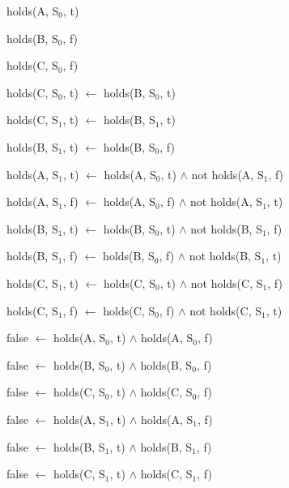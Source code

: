 \documentclass[a4paper,draft]{article}
\begin{document}
        \begin{list}{}{Initial State}
          \item holds(A, S$_{0}$, t)
          \item holds(B, S$_{0}$, f)
          \item holds(C, S$_{0}$, f)
        \end{list}

        \begin{list}{}{Constraint}
          \item holds(C, S$_{0}$, t) $\leftarrow$ holds(B, S$_{0}$, t)
          \item holds(C, S$_{1}$, t) $\leftarrow$ holds(B, S$_{1}$, t)
        \end{list}

        \begin{list}{}{Transformation}
          \item holds(B, S$_{1}$, t) $\leftarrow$ holds(B, S$_{0}$, f)
        \end{list}

        \begin{list}{}{Inertial Rules}
          \item
            holds(A, S$_{1}$, t) $\leftarrow$ holds(A, S$_{0}$, t) $\land$ not
            holds(A, S$_{1}$, f)
          \item
            holds(A, S$_{1}$, f) $\leftarrow$ holds(A, S$_{0}$, f) $\land$ not
            holds(A, S$_{1}$, t)
          \item
            holds(B, S$_{1}$, t) $\leftarrow$ holds(B, S$_{0}$, t) $\land$ not
            holds(B, S$_{1}$, f)
          \item
            holds(B, S$_{1}$, f) $\leftarrow$ holds(B, S$_{0}$, f) $\land$ not
            holds(B, S$_{1}$, t)
          \item
            holds(C, S$_{1}$, t) $\leftarrow$ holds(C, S$_{0}$, t) $\land$ not
            holds(C, S$_{1}$, f)
          \item
            holds(C, S$_{1}$, f) $\leftarrow$ holds(C, S$_{0}$, f) $\land$ not
            holds(C, S$_{1}$, t)
        \end{list}

        \begin{list}{}{Complementary Rules}
          \item
            false $\leftarrow$ holds(A, S$_{0}$, t) $\land$ holds(A, S$_{0}$, f)
          \item
            false $\leftarrow$ holds(B, S$_{0}$, t) $\land$ holds(B, S$_{0}$, f)
          \item
            false $\leftarrow$ holds(C, S$_{0}$, t) $\land$ holds(C, S$_{0}$, f)
          \item
            false $\leftarrow$ holds(A, S$_{1}$, t) $\land$ holds(A, S$_{1}$, f)
          \item
            false $\leftarrow$ holds(B, S$_{1}$, t) $\land$ holds(B, S$_{1}$, f)
          \item
            false $\leftarrow$ holds(C, S$_{1}$, t) $\land$ holds(C, S$_{1}$, f)
        \end{list}
\end{document}
